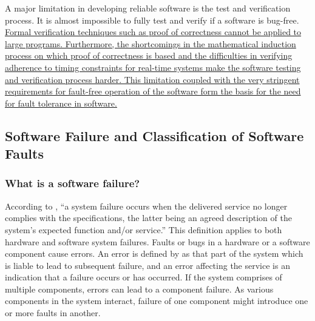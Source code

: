 \documentclass[a4paper, 11pt]{article}
\begin{document}
A major limitation in developing reliable software is the test and verification process. It is almost impossible to fully test and verify if a software is bug-free. \ul{Formal verification techniques such as proof of correctness cannot be applied to large programs. Furthermore, the shortcomings in the mathematical induction process on which proof of correctness is based and the difficulties in verifying adherence to timing constraints for real-time systems make the software testing and verification process harder. This limitation coupled with the very stringent requirements for fault-free operation of the software form the basis for the need for fault tolerance in software.}

\subsection{Software Failure and Classification of Software Faults}
\subsubsection{What is a software failure?}
According to \citet{laprie1992dependability}, ``a system failure occurs when the delivered service no longer complies with the specifications, the latter being an agreed description of the system's expected function and/or service.'' This definition applies to both hardware and software system failures. Faults or bugs in a hardware or a software component cause errors. An error is defined by \citet{laprie1992dependability} as that part of the system which is liable to lead to subsequent failure, and an error affecting the service is an indication that a failure occurs or has occurred. If the system comprises of multiple components, errors can lead to a component failure. As various components in the system interact, failure of one component might introduce one or more faults in another.

\end{document}
